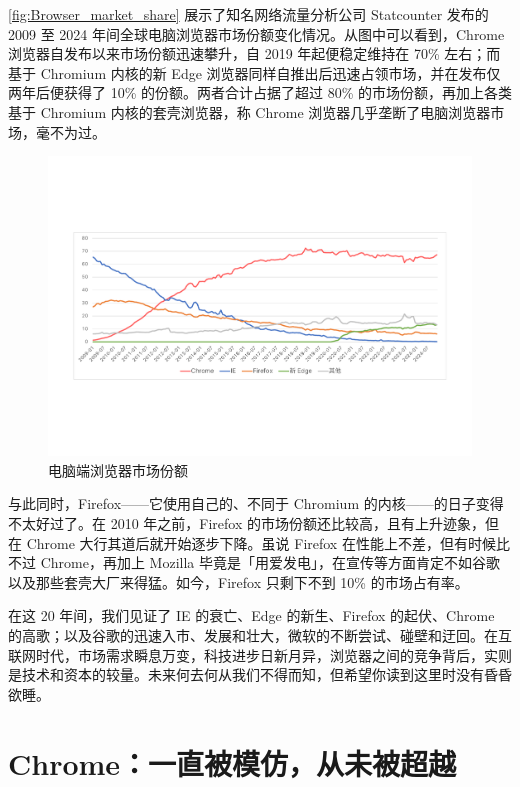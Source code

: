 \autoref{fig:Browser_market_share} 展示了知名网络流量分析公司 Statcounter 发布的 2009 至 2024 年间全球电脑浏览器市场份额变化情况。从图中可以看到，Chrome 浏览器自发布以来市场份额迅速攀升，自 2019 年起便稳定维持在 70\% 左右；而基于 Chromium 内核的新 Edge 浏览器同样自推出后迅速占领市场，并在发布仅两年后便获得了 10\% 的份额。两者合计占据了超过 80\% 的市场份额，再加上各类基于 Chromium 内核的套壳浏览器，称 Chrome 浏览器几乎垄断了电脑浏览器市场，毫不为过。

\begin{figure}[htb!]
  \centering
  \includegraphics[width=.9\textwidth]{assets/software/Browser_market_share.pdf}
  \caption{电脑端浏览器市场份额}
  \label{fig:Browser_market_share}
\end{figure}

与此同时，Firefox——它使用自己的、不同于 Chromium 的内核——的日子变得不太好过了。在 2010 年之前，Firefox 的市场份额还比较高，且有上升迹象，但在 Chrome 大行其道后就开始逐步下降。虽说 Firefox 在性能上不差，但有时候比不过 Chrome，再加上 Mozilla 毕竟是「用爱发电」，在宣传等方面肯定不如谷歌以及那些套壳大厂来得猛。如今，Firefox 只剩下不到 10\% 的市场占有率。

在这 20 年间，我们见证了 IE 的衰亡、Edge 的新生、Firefox 的起伏、Chrome 的高歌；以及谷歌的迅速入市、发展和壮大，微软的不断尝试、碰壁和迂回。在互联网时代，市场需求瞬息万变，科技进步日新月异，浏览器之间的竞争背后，实则是技术和资本的较量。未来何去何从我们不得而知，但希望你读到这里时没有昏昏欲睡。

\section{Chrome：一直被模仿，从未被超越}

